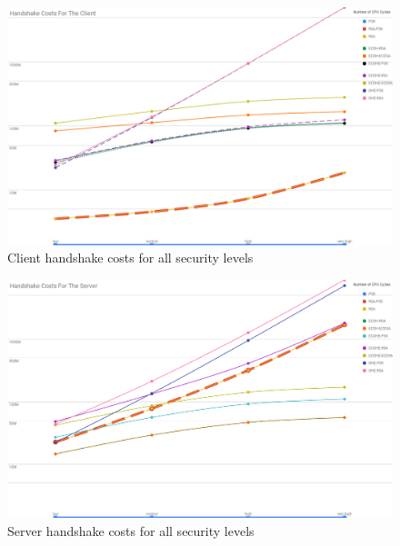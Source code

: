 \documentclass{llncs}
\begin{document}
\begin{figure}
  \centering
  \includegraphics[width=1.0\textwidth]{img/client_hs_costs_all_sls.png}
  \centering \caption{\label{fig:client-hs-costs-all-sls} Client handshake costs for all security levels}
\end{figure}

\begin{figure}
  \centering
  \includegraphics[width=1.0\textwidth]{img/server_hs_costs_all_sls.png}
  \centering \caption{\label{fig:server-hs-costs-all-sls} Server handshake costs for all security levels}
\end{figure}
\end{document}
